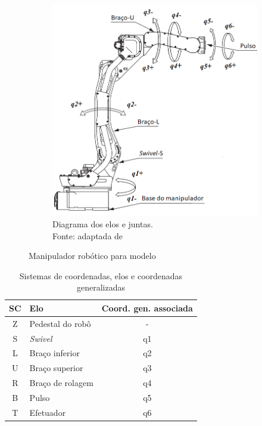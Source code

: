 \begin{figure}[h]
    \begin{subfigure}[b]{0.5\textwidth}
        \includegraphics[width=\textwidth]{figs/mh12_diagram}
        \caption{Diagrama dos elos e juntas. \\Fonte: adaptada de}
        \label{fig::mh12_diagram}
    \end{subfigure}
    \caption{Manipulador robótico para modelo}\label{fig::resumo_mh12}
\end{figure}

\begin{table}[h]
\centering
\caption{Sistemas de coordenadas, elos e coordenadas generalizadas}
\label{tab::resumo_mh12}
\begin{tabular}{@{}clc@{}}
\toprule
SC & Elo              & \multicolumn{1}{l}{Coord. gen. associada} \\ \midrule
Z  & Pedestal do robô & -                                         \\
S  & \textit{Swivel}  & q1                                        \\
L  & Braço inferior   & q2                                        \\
U  & Braço superior   & q3                                        \\
R  & Braço de rolagem & q4                                        \\
B  & Pulso            & q5                                        \\
T  & Efetuador        & q6                                        \\ \bottomrule
\end{tabular}
\end{table}

